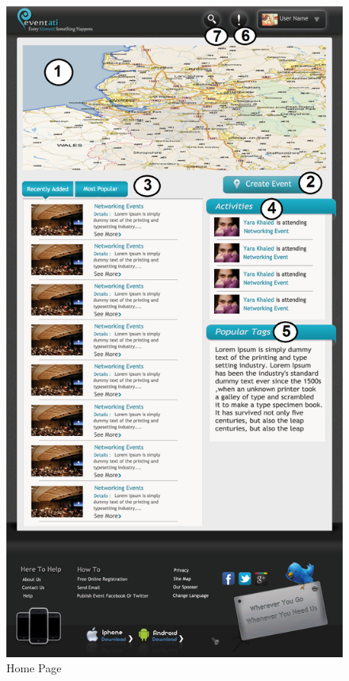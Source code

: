 \documentclass[12pt,a4paper,class,twoside,openany]{report}
\begin{document}
{\begin{figure}
\begin{center}
\includegraphics[height=8 in]{8-2}
\caption{Home Page}
\label{fg:8-2}
\end{center}
\end{figure}
\begin{figure}
\begin{center}

\end{center}
\end{figure}}
\end{document}
